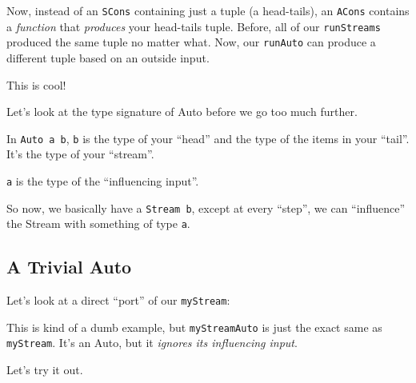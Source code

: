 \documentclass[]{article}
\newenvironment{Shaded}{}{}
\newcommand{\KeywordTok}[1]{\textcolor[rgb]{0.00,0.44,0.13}{\textbf{{#1}}}}
\newcommand{\DataTypeTok}[1]{\textcolor[rgb]{0.56,0.13,0.00}{{#1}}}
\newcommand{\DecValTok}[1]{\textcolor[rgb]{0.25,0.63,0.44}{{#1}}}
\newcommand{\OtherTok}[1]{\textcolor[rgb]{0.00,0.44,0.13}{{#1}}}
\newcommand{\FunctionTok}[1]{\textcolor[rgb]{0.02,0.16,0.49}{{#1}}}
\newcommand{\NormalTok}[1]{{#1}}
\begin{document}
Now, instead of an \texttt{SCons} containing just a tuple (a head-tails), an \texttt{ACons} contains
a \emph{function} that \emph{produces} your head-tails tuple. Before, all of our \texttt{runStreams}
produced the same tuple no matter what. Now, our \texttt{runAuto} can produce a different tuple
based on an outside input.

This is cool!

Let's look at the type signature of Auto before we go too much further.

In \texttt{Auto\ a\ b}, \texttt{b} is the type of your ``head'' and the type of the items in your
``tail''. It's the type of your ``stream''.

\texttt{a} is the type of the ``influencing input''.

So now, we basically have a \texttt{Stream\ b}, except at every ``step'', we can ``influence'' the
Stream with something of type \texttt{a}.

\subsection{A Trivial Auto}\label{a-trivial-auto}

Let's look at a direct ``port'' of our \texttt{myStream}:

\begin{Shaded}
\end{Shaded}

This is kind of a dumb example, but \texttt{myStreamAuto} is just the exact same as
\texttt{myStream}. It's an Auto, but it \emph{ignores its influencing input}.

Let's try it out.
\end{document}
